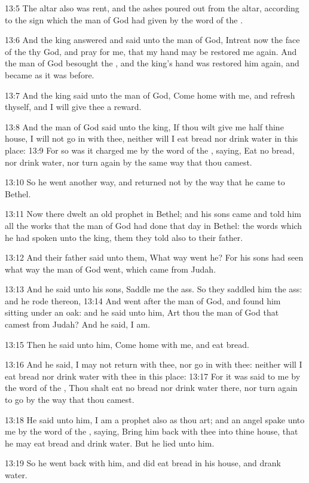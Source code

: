 13:5 The altar also was rent, and the ashes poured out from the altar,
according to the sign which the man of God had given by the word of
the \LORD.

13:6 And the king answered and said unto the man of God, Intreat now
the face of the \LORD thy God, and pray for me, that my hand may be
restored me again. And the man of God besought the \LORD, and the
king's hand was restored him again, and became as it was before.

13:7 And the king said unto the man of God, Come home with me, and
refresh thyself, and I will give thee a reward.

13:8 And the man of God said unto the king, If thou wilt give me half
thine house, I will not go in with thee, neither will I eat bread nor
drink water in this place: 13:9 For so was it charged me by the word
of the \LORD, saying, Eat no bread, nor drink water, nor turn again by
the same way that thou camest.

13:10 So he went another way, and returned not by the way that he came
to Bethel.

13:11 Now there dwelt an old prophet in Bethel; and his sons came and
told him all the works that the man of God had done that day in
Bethel: the words which he had spoken unto the king, them they told
also to their father.

13:12 And their father said unto them, What way went he? For his sons
had seen what way the man of God went, which came from Judah.

13:13 And he said unto his sons, Saddle me the ass. So they saddled
him the ass: and he rode thereon, 13:14 And went after the man of God,
and found him sitting under an oak: and he said unto him, Art thou the
man of God that camest from Judah? And he said, I am.

13:15 Then he said unto him, Come home with me, and eat bread.

13:16 And he said, I may not return with thee, nor go in with thee:
neither will I eat bread nor drink water with thee in this place:
13:17 For it was said to me by the word of the \LORD, Thou shalt eat no
bread nor drink water there, nor turn again to go by the way that thou
camest.

13:18 He said unto him, I am a prophet also as thou art; and an angel
spake unto me by the word of the \LORD, saying, Bring him back with
thee into thine house, that he may eat bread and drink water. But he
lied unto him.

13:19 So he went back with him, and did eat bread in his house, and
drank water.

